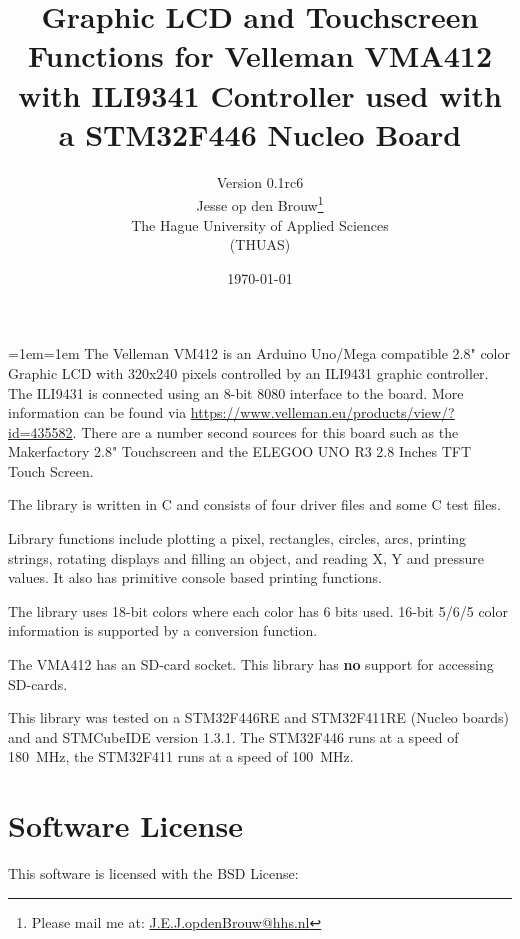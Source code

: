 \documentclass[12pt]{article}
\author{Version 0.1rc6\\[2ex]Jesse op den Brouw\thanks{Please mail me at: \href{mailto:J.E.J.opdenBrouw@hhs.nl}{J.E.J.opdenBrouw@hhs.nl}}\\The Hague University of Applied Sciences\\(THUAS)}
\title{Graphic LCD and Touchscreen Functions for Velleman VMA412 with ILI9341 Controller used with a STM32F446 Nucleo Board}
\date{\today}
\begin{document}
\raggedbottom
\maketitle

\vfill
{\small\leftskip=1em\rightskip=1em
The Velleman VM412 is an Arduino Uno/Mega compatible 2.8" color Graphic LCD with 320x240 pixels controlled by an ILI9431 graphic controller. The ILI9431 is connected using an 8-bit 8080 interface to the board. More information can be found via \url{https://www.velleman.eu/products/view/?id=435582}. There are a number second sources for this board such as the Makerfactory 2.8" Touchscreen and the ELEGOO UNO R3 2.8 Inches TFT Touch Screen.

The library is written in C and consists of four driver files and some C test files.

Library functions include plotting a pixel, rectangles, circles, arcs, printing strings, rotating displays and filling an object, and reading X, Y and pressure values. It also has primitive console based printing functions.

The library uses 18-bit colors where each color has 6 bits used. 16-bit 5/6/5 color information is supported by a conversion function.

The VMA412 has an SD-card socket. This library has \textbf{no} support for accessing SD-cards.

This library was tested on a STM32F446RE and STM32F411RE (Nucleo boards) and and STMCubeIDE version 1.3.1. The STM32F446 runs at a speed of 180~MHz, the STM32F411 runs at  a speed of 100~MHz.

}
\vfill

\newpage

\tableofcontents


\newpage

\section{Software License}
This software is licensed with the BSD License:
\end{document}

